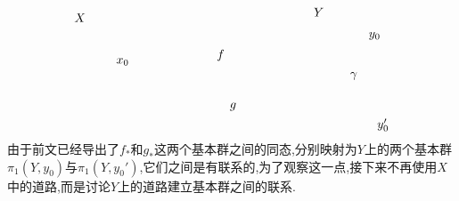 \documentclass{article}
\begin{document}
\[\begin{tikzpicture}[x=0.75pt,y=0.75pt,yscale=-1,xscale=1]
    \draw (121,106.4) node [anchor=north west][inner sep=0.75pt]    {$x_{0}$};
    \draw (76,58.4) node [anchor=north west][inner sep=0.75pt]    {$X$};
    \draw (333,52.4) node [anchor=north west][inner sep=0.75pt]    {$Y$};
    \draw (229,97.4) node [anchor=north west][inner sep=0.75pt]    {$f$};
    \draw (243,154.4) node [anchor=north west][inner sep=0.75pt]    {$g$};
    \draw (392,78.4) node [anchor=north west][inner sep=0.75pt]    {$y_{0}$};
    \draw (401,171.4) node [anchor=north west][inner sep=0.75pt]    {$y_{0} '$};
    \draw (372,121.4) node [anchor=north west][inner sep=0.75pt]    {$\gamma $};
    
    
    \end{tikzpicture}\]
    由于前文已经导出了$f_*$和$g_*$这两个基本群之间的同态,分别映射为$Y$上的两个基本群$\pi_1(Y,y_0)$与$\pi_1(Y,y_0')$,它们之间是有联系的,为了观察这一点,接下来不再使用$X$中的道路,而是讨论$Y$上的道路建立基本群之间的联系.
\end{document}
